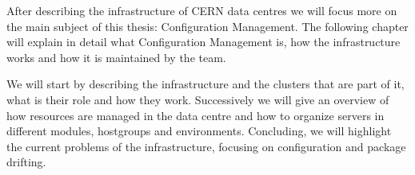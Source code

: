 
After describing the infrastructure of CERN data centres we will focus
more on the main subject of this thesis: Configuration Management. The
following chapter will explain in detail what Configuration Management is,
how the infrastructure works and how it is maintained by the team.

We will start by describing the infrastructure and the clusters that are
part of it, what is their role and how they work. Successively we will
give an overview of how resources are managed in the data centre and how
to organize servers in different modules, hostgroups and environments.
Concluding, we will highlight the current problems of the infrastructure,
focusing on configuration and package drifting.
